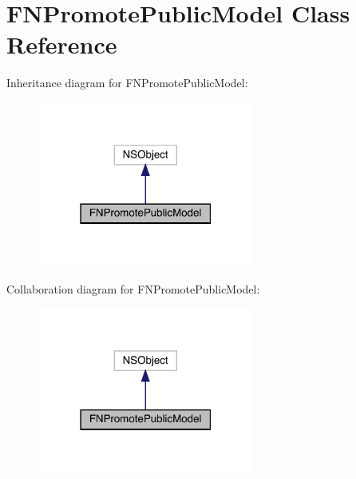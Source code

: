 \hypertarget{interface_f_n_promote_public_model}{}\section{F\+N\+Promote\+Public\+Model Class Reference}
\label{interface_f_n_promote_public_model}


Inheritance diagram for F\+N\+Promote\+Public\+Model\+:\nopagebreak
\begin{figure}[H]
\begin{center}
\leavevmode
\includegraphics[width=202pt]{interface_f_n_promote_public_model__inherit__graph}
\end{center}
\end{figure}


Collaboration diagram for F\+N\+Promote\+Public\+Model\+:\nopagebreak
\begin{figure}[H]
\begin{center}
\leavevmode
\includegraphics[width=202pt]{interface_f_n_promote_public_model__coll__graph}
\end{center}
\end{figure}
